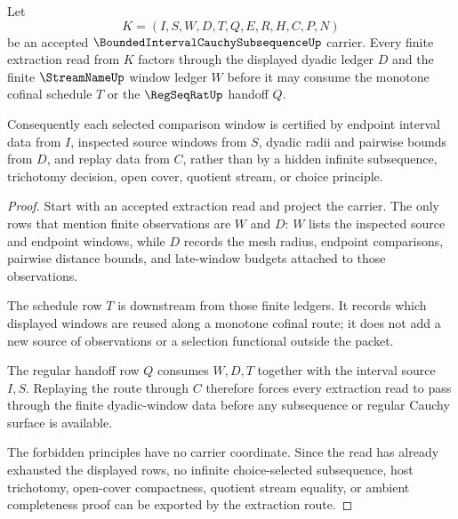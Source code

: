 \begin{theorem}
\label{thm:bounded-interval-cauchy-subsequence-dyadic-window-extraction}
Let
$$
K=(I,S,W,D,T,Q,E,R,H,C,P,N)
$$
be an accepted $\BoundedIntervalCauchySubsequenceUp$ carrier. Every finite extraction read from $K$ factors through the displayed dyadic ledger $D$ and the finite $\StreamNameUp$ window ledger $W$ before it may consume the monotone cofinal schedule $T$ or the $\RegSeqRatUp$ handoff $Q$.

Consequently each selected comparison window is certified by endpoint interval data from $I$, inspected source windows from $S$, dyadic radii and pairwise bounds from $D$, and replay data from $C$, rather than by a hidden infinite subsequence, trichotomy decision, open cover, quotient stream, or choice principle.
\end{theorem}
\begin{proof}
Start with an accepted extraction read and project the carrier. The only rows that mention finite observations are $W$ and $D$: $W$ lists the inspected source and endpoint windows, while $D$ records the mesh radius, endpoint comparisons, pairwise distance bounds, and late-window budgets attached to those observations.

The schedule row $T$ is downstream from those finite ledgers. It records which displayed windows are reused along a monotone cofinal route; it does not add a new source of observations or a selection functional outside the packet.

The regular handoff row $Q$ consumes $W,D,T$ together with the interval source $I,S$. Replaying the route through $C$ therefore forces every extraction read to pass through the finite dyadic-window data before any subsequence or regular Cauchy surface is available.

The forbidden principles have no carrier coordinate. Since the read has already exhausted the displayed rows, no infinite choice-selected subsequence, host trichotomy, open-cover compactness, quotient stream equality, or ambient completeness proof can be exported by the extraction route.
\end{proof}

